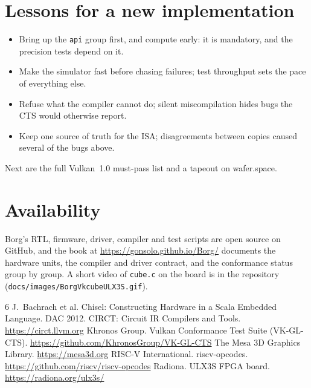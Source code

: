 \documentclass[sigconf,nonacm]{acmart}
\begin{document}
\section{Lessons for a new implementation}

\begin{itemize}
  \item Bring up the \texttt{api} group first, and compute early: it is
    mandatory, and the precision tests depend on it.
  \item Make the simulator fast before chasing failures; test throughput
    sets the pace of everything else.
  \item Refuse what the compiler cannot do; silent miscompilation hides
    bugs the CTS would otherwise report.
  \item Keep one source of truth for the ISA; disagreements between copies
    caused several of the bugs above.
\end{itemize}

Next are the full Vulkan~1.0 must-pass list and a tapeout on wafer.space.

\section{Availability}

Borg's RTL, firmware, driver, compiler and test scripts are open source on
GitHub, and the book at \url{https://gonsolo.github.io/Borg/} documents the
hardware units, the compiler and driver contract, and the conformance status
group by group. A short video of \texttt{cube.c} on the board is in the
repository (\texttt{docs/images/BorgVkcubeULX3S.gif}).

\begin{thebibliography}{6}
 J.~Bachrach et al. Chisel: Constructing Hardware in a
  Scala Embedded Language. DAC 2012.
 CIRCT: Circuit IR Compilers and Tools.
  \url{https://circt.llvm.org}
 Khronos Group. Vulkan Conformance Test Suite (VK-GL-CTS).
  \url{https://github.com/KhronosGroup/VK-GL-CTS}
 The Mesa 3D Graphics Library. \url{https://mesa3d.org}
 RISC-V International. riscv-opcodes.
  \url{https://github.com/riscv/riscv-opcodes}
 Radiona. ULX3S FPGA board. \url{https://radiona.org/ulx3s/}
\end{thebibliography}
\end{document}
